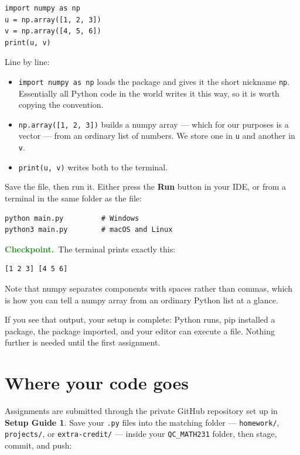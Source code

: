 \documentclass[11pt]{article}
\newcommand{\checkpoint}[1]{\par\smallskip\noindent
  {\small\sffamily\textcolor{ForestGreen}{\textbf{Checkpoint.}}\ #1}\par\smallskip}
\begin{document}
\begin{lstlisting}[style=py]
import numpy as np
u = np.array([1, 2, 3])
v = np.array([4, 5, 6])
print(u, v)
\end{lstlisting}

\noindent Line by line:

\begin{itemize}[leftmargin=1.4em,itemsep=4pt,topsep=4pt]
  \item \texttt{import numpy as np} loads the package and gives it the short
        nickname \texttt{np}. Essentially all Python code in the world writes it
        this way, so it is worth copying the convention.
  \item \texttt{np.array([1, 2, 3])} builds a numpy array --- which for our
        purposes is a vector --- from an ordinary list of numbers. We store one
        in \texttt{u} and another in \texttt{v}.
  \item \texttt{print(u, v)} writes both to the terminal.
\end{itemize}

\noindent Save the file, then run it. Either press the \textbf{Run} button in
your IDE, or from a terminal in the same folder as the file:

\begin{lstlisting}
python main.py         # Windows
python3 main.py        # macOS and Linux
\end{lstlisting}

\checkpoint{The terminal prints exactly this:}

\begin{lstlisting}
[1 2 3] [4 5 6]
\end{lstlisting}

\noindent Note that numpy separates components with spaces rather than commas,
which is how you can tell a numpy array from an ordinary Python list at a
glance.

\medskip
\noindent If you see that output, your setup is complete: Python runs, pip
installed a package, the package imported, and your editor can execute a file.
Nothing further is needed until the first assignment.

\section{Where your code goes}
Assignments are submitted through the private GitHub repository set up in
\textbf{Setup Guide 1}. Save your \texttt{.py} files into the matching folder
--- \texttt{homework/}, \texttt{projects/}, or \texttt{extra-credit/} --- inside
your \texttt{QC\_MATH231} folder, then stage, commit, and push:
\end{document}
